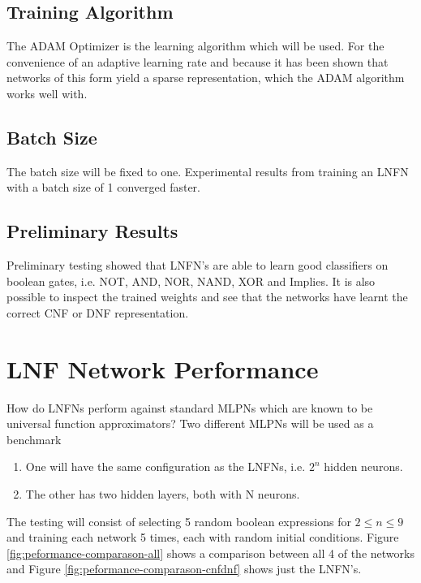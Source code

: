 \subsection{Training Algorithm}
The ADAM Optimizer \cite{kingma2014adam} is the learning algorithm which will be used. For the convenience of an adaptive learning rate and because it has been shown that networks of this form yield a sparse representation, which the ADAM algorithm works well with.

\subsection{Batch Size}
The batch size will be fixed to one. Experimental results from training an LNFN with a batch size of 1 converged faster. 

\subsection{Preliminary Results}
Preliminary testing showed that LNFN's are able to learn good classifiers on boolean gates, i.e. NOT, AND, NOR, NAND, XOR and Implies. It is also possible to inspect the trained weights and see that the networks have learnt the correct CNF or DNF representation.

\section{LNF Network Performance}
How do LNFNs perform against standard MLPNs which are known to be universal function approximators? Two different MLPNs will be used as a benchmark

\begin{enumerate}
	\item One will have the same configuration as the LNFNs, i.e. $2^n$ hidden neurons. \label{lnfn-peformance:mlpn-arch-1}
	\item The other has two hidden layers, both with N neurons.
\end{enumerate}

The testing will consist of selecting 5 random boolean expressions for $2 \leq n \leq 9$ and training each network 5 times, each with random initial conditions. Figure \ref{fig:peformance-comparason-all} shows a comparison between all 4 of the networks and Figure \ref{fig:peformance-comparason-cnfdnf} shows just the LNFN's.

